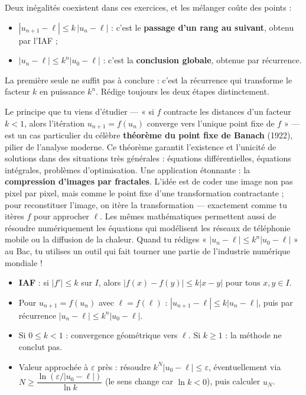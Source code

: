 \documentclass[11pt]{article}
\begin{document}
\begin{attention}
Deux inégalités coexistent dans ces exercices, et les mélanger coûte des points :
\begin{itemize}
\item $|u_{n+1} - \ell| \leq k\,|u_n - \ell|$ : c'est le \textbf{passage d'un rang au suivant}, obtenu par l'IAF ;
\item $|u_n - \ell| \leq k^n |u_0 - \ell|$ : c'est la \textbf{conclusion globale}, obtenue par récurrence.
\end{itemize}
La première seule ne suffit pas à conclure : c'est la récurrence qui transforme le facteur $k$ en puissance $k^n$. Rédige toujours les deux étapes distinctement.
\end{attention}

\begin{savaistu}
Le principe que tu viens d'étudier — « si $f$ contracte les distances d'un facteur $k < 1$, alors l'itération $u_{n+1} = f(u_n)$ converge vers l'unique point fixe de $f$ » — est un cas particulier du célèbre \textbf{théorème du point fixe de Banach} (1922), pilier de l'analyse moderne. Ce théorème garantit l'existence et l'unicité de solutions dans des situations très générales : équations différentielles, équations intégrales, problèmes d'optimisation. Une application étonnante : la \textbf{compression d'images par fractales}. L'idée est de coder une image non pas pixel par pixel, mais comme le point fixe d'une transformation contractante ; pour reconstituer l'image, on itère la transformation — exactement comme tu itères $f$ pour approcher $\ell$. Les mêmes mathématiques permettent aussi de résoudre numériquement les équations qui modélisent les réseaux de téléphonie mobile ou la diffusion de la chaleur. Quand tu rédiges « $|u_n - \ell| \leq k^n |u_0 - \ell|$ » au Bac, tu utilises un outil qui fait tourner une partie de l'industrie numérique mondiale !
\end{savaistu}

\begin{aretenir}
\begin{itemize}
\item \textbf{IAF} : si $|f'| \leq k$ sur $I$, alors $|f(x) - f(y)| \leq k|x - y|$ pour tous $x, y \in I$.
\item Pour $u_{n+1} = f(u_n)$ avec $\ell = f(\ell)$ : $|u_{n+1} - \ell| \leq k|u_n - \ell|$, puis par récurrence $|u_n - \ell| \leq k^n |u_0 - \ell|$.
\item Si $0 \leq k < 1$ : convergence géométrique vers $\ell$. Si $k \geq 1$ : la méthode ne conclut pas.
\item Valeur approchée à $\varepsilon$ près : résoudre $k^N |u_0 - \ell| \leq \varepsilon$, éventuellement via $N \geq \dfrac{\ln(\varepsilon / |u_0 - \ell|)}{\ln k}$ (le sens change car $\ln k < 0$), puis calculer $u_N$.
\end{itemize}
\end{aretenir}
\end{document}
